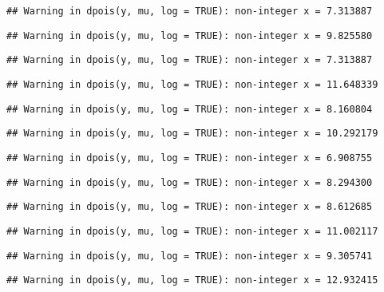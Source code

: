 \documentclass[
]{article}
\begin{document}
\begin{verbatim}
## Warning in dpois(y, mu, log = TRUE): non-integer x = 7.313887
\end{verbatim}

\begin{verbatim}
## Warning in dpois(y, mu, log = TRUE): non-integer x = 9.825580
\end{verbatim}

\begin{verbatim}
## Warning in dpois(y, mu, log = TRUE): non-integer x = 7.313887
\end{verbatim}

\begin{verbatim}
## Warning in dpois(y, mu, log = TRUE): non-integer x = 11.648339
\end{verbatim}

\begin{verbatim}
## Warning in dpois(y, mu, log = TRUE): non-integer x = 8.160804
\end{verbatim}

\begin{verbatim}
## Warning in dpois(y, mu, log = TRUE): non-integer x = 10.292179
\end{verbatim}

\begin{verbatim}
## Warning in dpois(y, mu, log = TRUE): non-integer x = 6.908755
\end{verbatim}

\begin{verbatim}
## Warning in dpois(y, mu, log = TRUE): non-integer x = 8.294300
\end{verbatim}

\begin{verbatim}
## Warning in dpois(y, mu, log = TRUE): non-integer x = 8.612685
\end{verbatim}

\begin{verbatim}
## Warning in dpois(y, mu, log = TRUE): non-integer x = 11.002117
\end{verbatim}

\begin{verbatim}
## Warning in dpois(y, mu, log = TRUE): non-integer x = 9.305741
\end{verbatim}

\begin{verbatim}
## Warning in dpois(y, mu, log = TRUE): non-integer x = 12.932415
\end{verbatim}
\end{document}
